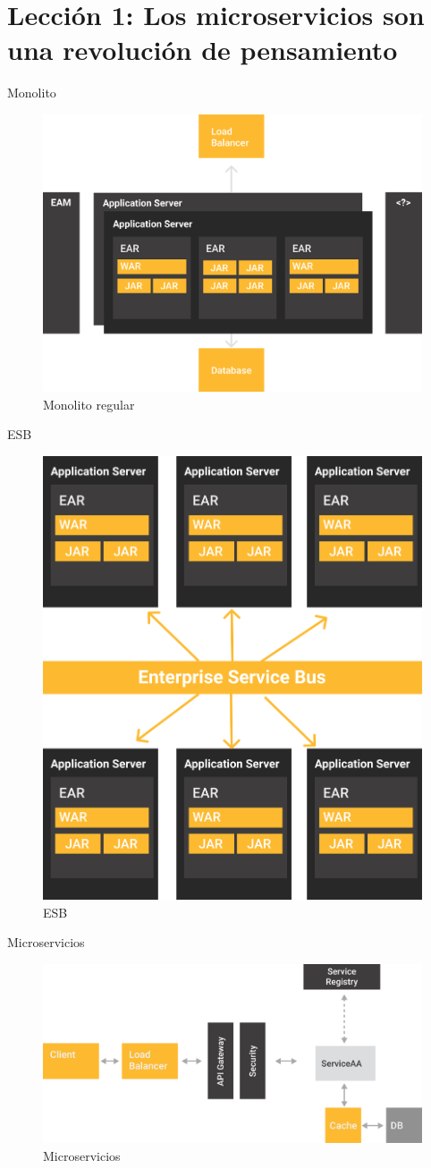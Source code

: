 \documentclass{beamer}
\begin{document}
\section{Lección 1: Los microservicios son una revolución de pensamiento}
\begin{frame}{Monolito}
\begin{figure}
	\centering
	\includegraphics[width=0.7\linewidth]{Images/monolitos}
	\caption{Monolito regular}
\end{figure}
\end{frame}

\begin{frame}{ESB}
\begin{figure}
\centering
\includegraphics[width=0.5\linewidth]{Images/esb}
\caption{ESB}
\end{figure}
\end{frame}

\begin{frame}{Microservicios}
\begin{figure}
\centering
\includegraphics[width=\linewidth]{Images/microservicios}
\caption{Microservicios}
\end{figure}
\end{frame}
\end{document}
